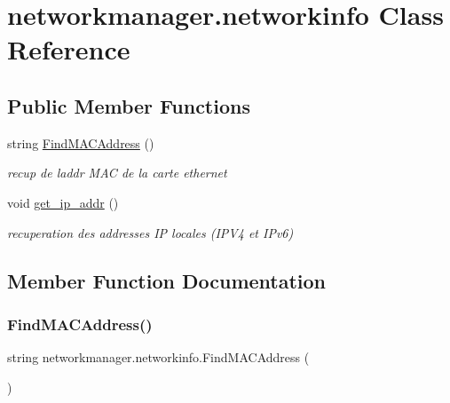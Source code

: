 \hypertarget{classnetworkmanager_1_1networkinfo}{}\section{networkmanager.\+networkinfo Class Reference}
\label{classnetworkmanager_1_1networkinfo}
\subsection*{Public Member Functions}
\begin{DoxyCompactItemize}
\item 
string \hyperlink{classnetworkmanager_1_1networkinfo_ab72b51758b290d0739f840d7ca8a62d6}{Find\+M\+A\+C\+Address} ()
\begin{DoxyCompactList}\small\item\em recup de l\textquotesingle{}addr M\+AC de la carte ethernet \end{DoxyCompactList}\item 
void \hyperlink{classnetworkmanager_1_1networkinfo_accd33e70bd87b921e0094e4647f71c15}{get\+\_\+ip\+\_\+addr} ()
\begin{DoxyCompactList}\small\item\em recuperation des addresses IP locales (I\+P\+V4 et I\+Pv6) \end{DoxyCompactList}\end{DoxyCompactItemize}


\subsection{Member Function Documentation}
\mbox{\label{classnetworkmanager_1_1networkinfo_ab72b51758b290d0739f840d7ca8a62d6}} 
\subsubsection{\texorpdfstring{Find\+M\+A\+C\+Address()}{FindMACAddress()}}
{\footnotesize\ttfamily string networkmanager.\+networkinfo.\+Find\+M\+A\+C\+Address (\begin{DoxyParamCaption}{ }\end{DoxyParamCaption})}




